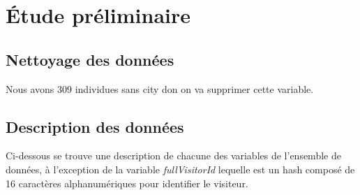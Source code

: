 \documentclass[12pt, a4paper]{article}
\begin{document}
\section{Étude préliminaire}
\subsection{Nettoyage des données}
Nous avons 309 individues sans city don on va supprimer cette variable.

\subsection{Description des données}
Ci-dessous se trouve une description de chacune des variables de l'ensemble de données, à l'exception de la variable \textit{fullVisitorId} lequelle est un hash composé de 16 caractères alphanumériques pour identifier le visiteur.
\end{document}
